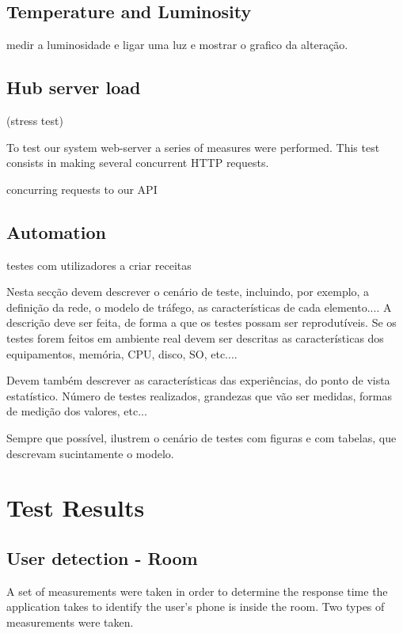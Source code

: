 \subsection{Temperature and Luminosity}

medir a luminosidade e ligar uma luz e mostrar o grafico da alteração.


\subsection{Hub server load}

(stress test)

To test our system web-server a series of measures were performed. This test consists in making several concurrent \ac{HTTP} requests.

 concurring requests to our \ac{API} 


\subsection{Automation}
testes com utilizadores a criar receitas



Nesta secção devem descrever o cenário de teste, incluindo, por exemplo, a
definição da rede, o modelo de tráfego, as características de cada elemento....
A descrição deve ser feita, de forma a que os testes possam ser reprodutíveis.
Se os testes forem feitos em ambiente real devem ser descritas as características
dos equipamentos, memória, CPU, disco, SO, etc....

Devem também descrever as características das experiências, do ponto de vista
estatístico. Número de testes realizados, grandezas que vão ser medidas, formas de
medição dos valores, etc...

Sempre que possível, ilustrem o cenário de testes com figuras e com tabelas, que
descrevam sucintamente o modelo.

\section{Test Results}


\subsection{User detection - Room}

A set of measurements were taken in order to determine the response time the application takes to identify the user's phone is inside the room. Two types of measurements were taken.

